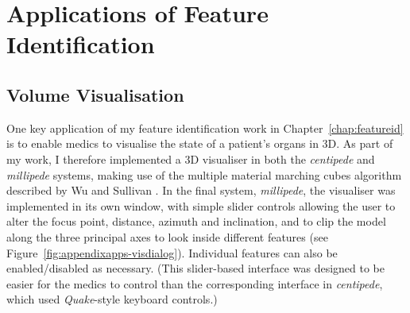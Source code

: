 \chapter{Applications of Feature Identification}
\label{chap:appendixapps}

\section{Volume Visualisation}


One key application of my feature identification work in Chapter~\ref{chap:featureid} is to enable medics to visualise the state of a patient's organs in 3D. As part of my work, I therefore implemented a 3D visualiser in both the \emph{centipede} and \emph{millipede} systems, making use of the multiple material marching cubes algorithm described by Wu and Sullivan \cite{wu03}. In the final system, \emph{millipede}, the visualiser was implemented in its own window, with simple slider controls allowing the user to alter the focus point, distance, azimuth and inclination, and to clip the model along the three principal axes to look inside different features (see Figure~\ref{fig:appendixapps-visdialog}). Individual features can also be enabled/disabled as necessary. (This slider-based interface was designed to be easier for the medics to control than the corresponding interface in \emph{centipede}, which used \emph{Quake}-style keyboard controls.)


